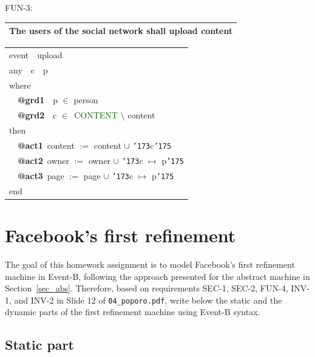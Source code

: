 \documentclass{article} %
\newcommand{\lcb}{{\tt {\char '173}}}
\newcommand{\rcb}{{\tt {\char '175}}}
\newcommand{\ebkeyw}[1]{\textcolor{pred}{\textsf{#1}}}
\newcommand{\ebtag}[1]{\textcolor{pgrey}{\textsf{\bf #1}}}
\newcommand{\ebsets}[1]{\textcolor{darkgreen}{\textsf{#1}}}
\begin{document}
\begin{center}
{\color{red!100}FUN-3}:
\begin{tabular}{|l|} \hline
The users of the social network shall upload content \\
\hline
\end{tabular}
\end{center}
%
\begin{center}
\begin{tabular}{l}
\ebkeyw{event}~~upload\\
\ebkeyw{any}~~c~~p \\ 
\ebkeyw{where}\\
~~\ebtag{@grd1}~~p $\in$ person\\
~~\ebtag{@grd2}~~c $\in$~\ebsets{CONTENT} $\setminus$ content\\
\ebkeyw{then}\\
~~\ebtag{@act1}~content $:=$ content $\cup$ \lcb{}c\rcb{}\\
~~\ebtag{@act2}~owner $:=$ owner $\cup$ \lcb{}c $\mapsto$ p\rcb \\
~~\ebtag{@act3}~page $:=$ page $\cup$ \lcb{}c $\mapsto$ p\rcb \\
\ebkeyw{end}
\end{tabular}
\end{center}

\section{Facebook's first refinement}
\label{sec_ref}


\noindent
The goal of this homework assignment is to model Facebook's first refinement machine in Event-B, following the approach presented for the abstract machine in Section~\ref{sec_abs}. Therefore, based on requirements SEC-1, SEC-2, FUN-4, INV-1, and INV-2 in Slide 12 of \texttt{04\_\-poporo.\-pdf}, write below the static and the dynamic parts of the first refinement machine using Event-B syntax.


\subsection{Static part}
\label{sec_ref_static}
\end{document}
